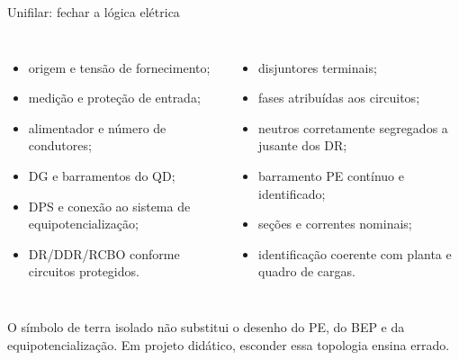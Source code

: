 \begin{frame}{Unifilar: fechar a lógica elétrica}
\small
\begin{columns}[T,onlytextwidth]
\begin{itemize}
\item origem e tensão de fornecimento;
\item medição e proteção de entrada;
\item alimentador e número de condutores;
\item DG e barramentos do QD;
\item DPS e conexão ao sistema de equipotencialização;
\item DR/DDR/RCBO conforme circuitos protegidos.
\end{itemize}
\begin{itemize}
\item disjuntores terminais;
\item fases atribuídas aos circuitos;
\item neutros corretamente segregados a jusante dos DR;
\item barramento PE contínuo e identificado;
\item seções e correntes nominais;
\item identificação coerente com planta e quadro de cargas.
\end{itemize}
\end{columns}
\begin{caixaAt}
O símbolo de terra isolado não substitui o desenho do PE, do BEP e da equipotencialização. Em projeto didático, esconder essa topologia ensina errado.
\end{caixaAt}
\end{frame}

